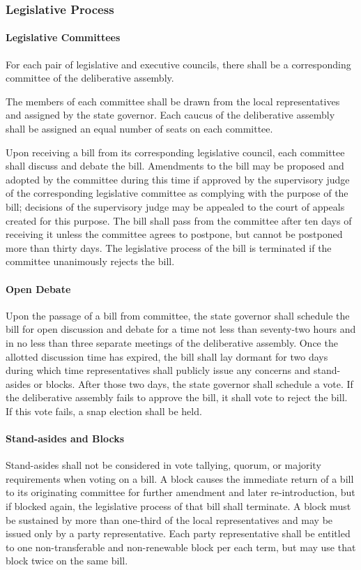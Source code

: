 \documentclass{article}
\begin{document}
\subsubsection{Legislative Process}
\paragraph{Legislative Committees}
For each pair of legislative and executive councils, there shall be a corresponding committee of the deliberative assembly.

The members of each committee shall be drawn from the local representatives and assigned by the state governor. Each caucus of the deliberative assembly shall be assigned an equal number of seats on each committee. 

Upon receiving a bill from its corresponding legislative council, each committee shall discuss and debate the bill. Amendments to the bill may be proposed and adopted by the committee during this time if approved by the supervisory judge of the corresponding legislative committee as complying with the purpose of the bill; decisions of the supervisory judge may be appealed to the court of appeals created for this purpose. The bill shall pass from the committee after ten days of receiving it unless the committee agrees to postpone, but cannot be postponed more than thirty days. The legislative process of the bill is terminated if the committee unanimously rejects the bill.
\paragraph{Open Debate}
Upon the passage of a bill from committee, the state governor shall schedule the bill for open discussion and debate for a time not less than seventy-two hours and in no less than three separate meetings of the deliberative assembly. Once the allotted discussion time has expired, the bill shall lay dormant for two days during which time representatives shall publicly issue any concerns and stand-asides or blocks. After those two days, the state governor shall schedule a vote. If the deliberative assembly fails to approve the bill, it shall vote to reject the bill. If this vote fails, a snap election shall be held.
\paragraph{Stand-asides and Blocks}
Stand-asides shall not be considered in vote tallying, quorum, or majority requirements when voting on a bill. A block causes the immediate return of a bill to its originating committee for further amendment and later re-introduction, but if blocked again, the legislative process of that bill shall terminate. A block must be sustained by more than one-third of the local representatives and may be issued only by a party representative. Each party representative shall be entitled to one non-transferable and non-renewable block per each term, but may use that block twice on the same bill.
\end{document}
